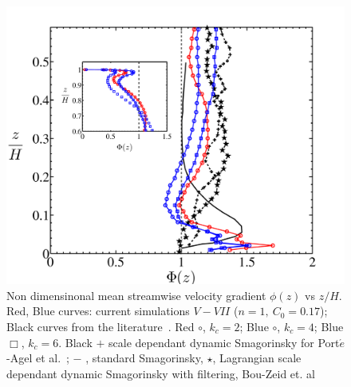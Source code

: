 \begin{figure}
\centering
\includegraphics[width = 0.75\linewidth]{Fig3/gradient_filt_n1.pdf}        
        \caption[$\Phi(z)$, Case $V-VII$]{Non dimensinonal mean streamwise velocity gradient $\phi(z)$ vs $z/H$. Red, Blue curves: current simulations $V-VII$ ($n = 1, \ C_0 = 0.17$); Black curves from the literature~\cite{porte1fun,bou1}. Red $\circ$, $k_{c}=2$; Blue $\circ$, $k_{c} = 4$; Blue $\Box$, $k_{c} = 6$. Black $+$ scale dependant dynamic Smagorinsky for Port$\acute{e}$-Agel et al.~\cite{porte1fun}; $-$ , standard Smagorinsky, $\star$, Lagrangian scale dependant dynamic Smagorinsky with filtering, Bou-Zeid et. al~\cite{bou1}}\label{fig:statba}
\end{figure}

